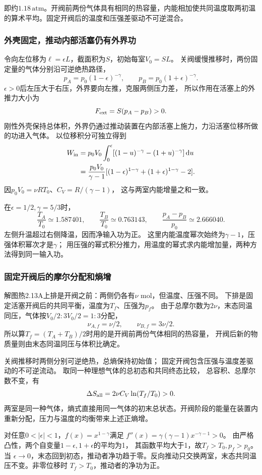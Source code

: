 \documentclass[UTF8,fontset=fandol,a4paper,11pt]{ctexart}
\newcommand{\dd}{\mathop{}\!\mathrm{d}}
\begin{document}
即约$1.18\,\mathrm{atm}$。开阀前两份气体具有相同的热容量，内能相加使共同温度取两初温的算术平均。固定开阀后的温度和压强差驱动不可逆混合。
\subsubsection*{外壳固定，推动内部活塞仍有外界功}
令向左位移为$\ell=\epsilon L$，截面积为$S$，初始每室$V_0=SL$。
关阀缓慢推移时，两份固定量的气体分别沿可逆绝热路径，
\[
p_A=p_0(1-\epsilon)^{-\gamma},\qquad
p_B=p_0(1+\epsilon)^{-\gamma}.
\]
$\epsilon>0$后左压大于右压，外界要向左推，克服两侧压力差，
所以作用在活塞上的外推力大小为
\[
F_{\rm ext}=S(p_A-p_B)>0.
\]
刚性外壳保持总体积，外界仍通过推动装置在内部活塞上施力，力沿活塞位移所做的功进入气体。
以位移积分可独立得到
\[
\begin{aligned}
W_{\rm in}
&=p_0V_0\int_0^\epsilon
[(1-u)^{-\gamma}-(1+u)^{-\gamma}]\dd u\\
&=\frac{p_0V_0}{\gamma-1}
[(1-\epsilon)^{1-\gamma}+(1+\epsilon)^{1-\gamma}-2].
\end{aligned}
\]
因$p_0V_0=\nu RT_0$、$C_V=R/(\gamma-1)$，
这与两室内能增量之和一致。

在$\epsilon=1/2,\gamma=5/3$时，
\[
\frac{T_A}{T_0}\simeq1.587401,\qquad
\frac{T_B}{T_0}\simeq0.763143,\qquad
\frac{p_A-p_B}{p_0}\simeq2.666040.
\]
左侧升温超过右侧降温，因而净输入功为正。
这里内能温度幂次始终为$\gamma-1$，压强体积幂次才是$\gamma$；
用压强的幂式积分推力，用温度的幂式求内能增加量，两种方法得到同一输入功。

\subsubsection*{固定开阀后的摩尔分配和熵增}
解图热2.13A上排是开阀之前：两侧仍各有$\nu$ mol，但温度、压强不同。
下排是固定活塞开阀后的共同平衡，温度为$T_f$、压强为$p_f$。
由于总摩尔数为$2\nu$，末态同温同压，气体按$V_0/2:3V_0/2=1:3$分配，
\[
\nu_{A,f}=\nu/2,\qquad \nu_{B,f}=3\nu/2.
\]
所以算$T_f=(T_A+T_B)/2$时用的是开阀前两份气体相同的热容量，
开阀后新的物质量则由末态同温同压与体积比确定。

关阀推移时两侧分别可逆绝热，总熵保持初始值；
固定开阀包含压强与温度差驱动的不可逆流动。
取同一种理想气体的总初态和共同终态比较，
总容积、总摩尔数不变，有
\[
\Delta S_{\rm all}=2\nu C_V\ln(T_f/T_0)>0.
\]
两室是同一种气体，熵式直接用同一气体的初末总状态。开阀阶段的能量在装置内重新分配，压力与温度的均衡带来上述正熵增。

对任意$0<|\epsilon|<1$，$f(x)=x^{1-\gamma}$满足
$f''(x)=\gamma(\gamma-1)x^{-\gamma-1}>0$。
由严格凸性，两个自变量$1-\epsilon,1+\epsilon$的平均为1，
其函数平均大于1，故$T_f>T_0,p_f>p_0$。
当 $\epsilon\to0$，末态回到初态，推动者净功趋于零。反向推动只交换两室，末态共同温压不变。非零位移时 $T_f>T_0$，推动者的净功为正。
\end{document}
